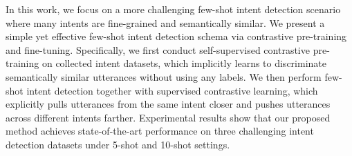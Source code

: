 In this work, we focus on a more challenging few-shot intent detection scenario where many intents are fine-grained and semantically similar. We present a simple yet effective few-shot intent detection schema via contrastive pre-training and fine-tuning. Specifically, we first conduct self-supervised contrastive pre-training on collected intent datasets, which implicitly learns to discriminate semantically similar utterances without using any labels. We then perform few-shot intent detection together with supervised contrastive learning, which explicitly pulls utterances from the same intent closer and pushes utterances across different intents farther.  Experimental results show that our proposed method achieves state-of-the-art performance on three challenging intent detection datasets under 5-shot and 10-shot settings.
